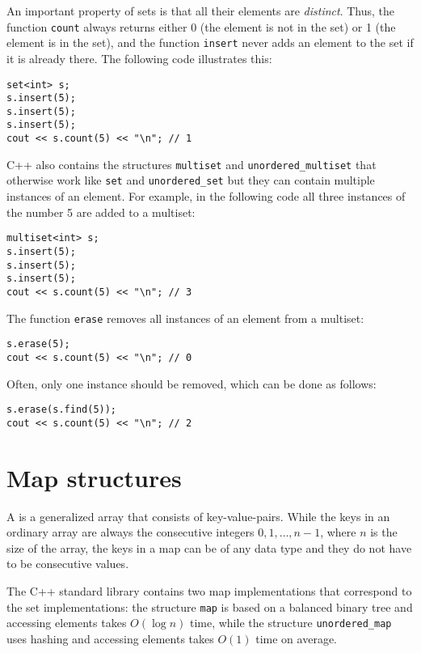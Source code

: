 An important property of sets is
that all their elements are \emph{distinct}.
Thus, the function \texttt{count} always returns
either 0 (the element is not in the set)
or 1 (the element is in the set),
and the function \texttt{insert} never adds
an element to the set if it is
already there.
The following code illustrates this:

\begin{lstlisting}
set<int> s;
s.insert(5);
s.insert(5);
s.insert(5);
cout << s.count(5) << "\n"; // 1
\end{lstlisting}

C++ also contains the structures
\texttt{multiset} and \texttt{unordered\_multiset}
that otherwise work like \texttt{set}
and \texttt{unordered\_set}
but they can contain multiple instances of an element.
For example, in the following code all three instances
of the number 5 are added to a multiset:

\begin{lstlisting}
multiset<int> s;
s.insert(5);
s.insert(5);
s.insert(5);
cout << s.count(5) << "\n"; // 3
\end{lstlisting}
The function \texttt{erase} removes
all instances of an element
from a multiset:
\begin{lstlisting}
s.erase(5);
cout << s.count(5) << "\n"; // 0
\end{lstlisting}
Often, only one instance should be removed,
which can be done as follows:
\begin{lstlisting}
s.erase(s.find(5));
cout << s.count(5) << "\n"; // 2
\end{lstlisting}

\section{Map structures}


A  is a generalized array
that consists of key-value-pairs.
While the keys in an ordinary array are always
the consecutive integers $0,1,\ldots,n-1$,
where $n$ is the size of the array,
the keys in a map can be of any data type and
they do not have to be consecutive values.

The C++ standard library contains two map
implementations that correspond to the set
implementations: the structure
\texttt{map} is based on a balanced
binary tree and accessing elements
takes $O(\log n)$ time,
while the structure
\texttt{unordered\_map} uses hashing
and accessing elements takes $O(1)$ time on average.


